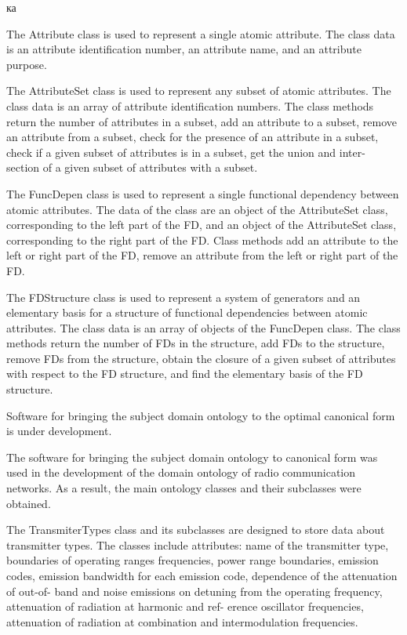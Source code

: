 ка\documentclass[times]{article}
\begin{document}
The Attribute class is used to represent a single atomic attribute. The class data is an attribute identification number, an attribute name, and an attribute purpose.

The AttributeSet class is used to represent any subset of atomic attributes. The class data is an array of attribute identification numbers. The class methods return the number of attributes in a subset, add an attribute to a subset, remove an attribute from a subset, check for the presence of an attribute in a subset, check if a given subset of attributes is in a subset, get the union and inter- section of a given subset of attributes with a subset.

The FuncDepen class is used to represent a single functional dependency between atomic attributes. The data of the class are an object of the AttributeSet class, corresponding to the left part of the FD, and an object of the AttributeSet class, corresponding to the right part of the FD. Class methods add an attribute to the left or right part of the FD, remove an attribute from the left or right part of the FD.

The FDStructure class is used to represent a system of generators and an elementary basis for a structure of functional dependencies between atomic attributes. The class data is an array of objects of the FuncDepen class. The class methods return the number of FDs in the structure, add FDs to the structure, remove FDs from the structure, obtain the closure of a given subset of attributes with respect to the FD structure, and find the elementary basis of the FD structure.

Software for bringing the subject domain ontology to the optimal canonical form is under development.

The software for bringing the subject domain ontology to canonical form was used in the development of the domain ontology of radio communication networks. As a result, the main ontology classes and their subclasses were obtained.

The TransmiterTypes class and its subclasses are designed to store data about transmitter types. The classes include attributes: name of the transmitter type, boundaries of operating ranges frequencies, power range boundaries, emission codes, emission bandwidth for each emission code, dependence of the attenuation of out-of- band and noise emissions on detuning from the operating frequency, attenuation of radiation at harmonic and ref- erence oscillator frequencies, attenuation of radiation at combination and intermodulation frequencies.
\end{document}
